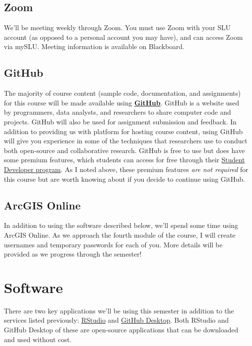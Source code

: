 \documentclass[
]{book}
\begin{document}
\hypertarget{zoom}{%
\subsection{Zoom}\label{zoom}}

We'll be meeting weekly through Zoom. You must use Zoom with your SLU account (as opposed to a personal account you may have), and can access Zoom via mySLU. Meeting information is available on Blackboard.

\hypertarget{github}{%
\subsection{GitHub}\label{github}}

The majority of course content (sample code, documentation, and assignments) for this course will be made available using \textbf{\href{http://www.github.com}{GitHub}}. GitHub is a website used by programmers, data analysts, and researchers to share computer code and projects. GitHub will also be used for assignment submission and feedback. In addition to providing us with platform for hosting course content, using GitHub will give you experience in some of the techniques that researchers use to conduct both open-source and collaborative research. GitHub is free to use but does have some premium features, which students can access for free through their \href{https://education.github.com/pack/}{Student Developer program}. As I noted above, these premium features \emph{are not required} for this course but are worth knowing about if you decide to continue using GitHub.

\hypertarget{arcgis-online}{%
\subsection{ArcGIS Online}\label{arcgis-online}}

In addition to using the software described below, we'll spend some time using ArcGIS Online. As we approach the fourth module of the course, I will create usernames and temporary passwords for each of you. More details will be provided as we progress through the semester!

\hypertarget{software}{%
\section{Software}\label{software}}

There are two key applications we'll be using this semester in addition to the services listed previously: \href{https://www.rstudio.com}{RStudio} and \href{https://desktop.github.com}{GitHub Desktop}. Both RStudio and GitHub Desktop of these are open-source applications that can be downloaded and used without cost.
\end{document}
